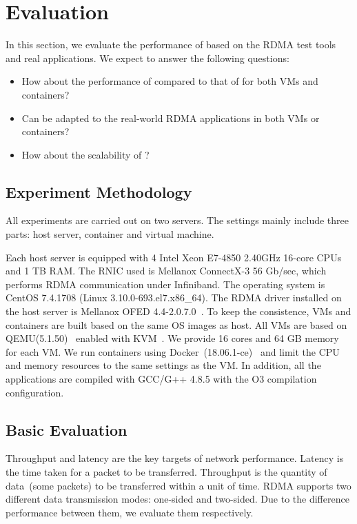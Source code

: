 \section{Evaluation} \label{eval}
In this section, we evaluate the performance of \sys based on the RDMA test tools and real applications. We expect to answer the following questions:

\begin{itemize}
\item How about the performance of \sys compared to that of \native for both VMs and containers?
\item Can \sys be adapted to the real-world RDMA applications in both VMs or containers?
\item How about the scalability of \sys?
\end{itemize}

\subsection{Experiment Methodology}


All experiments are carried out on two servers. The settings mainly include three parts: host server, container and virtual machine. 

Each host server is equipped with 4 Intel Xeon E7-4850 2.40GHz 16-core CPUs and 1 TB RAM. The RNIC used is Mellanox ConnectX-3 56 Gb/sec, which performs RDMA communication under Infiniband.  The operating system is CentOS 7.4.1708 (Linux 3.10.0-693.el7.x86\_64). The RDMA driver installed on the host server is Mellanox OFED 4.4-2.0.7.0~\cite{mlnx-ofed}. To keep the consistence, VMs and containers are built based on the same OS images as host. All VMs are based on QEMU(5.1.50)~\cite{qemu} enabled with KVM~\cite{kvm}. We provide 16 cores and 64 GB memory for each VM. We run containers using Docker~(18.06.1-ce)~\cite{docker} and limit the CPU and memory resources to the same settings as the VM. In addition, all the applications are compiled with GCC/G++ 4.8.5 with the O3 compilation configuration. 


\subsection{Basic Evaluation}

Throughput and latency are the key targets of network performance. Latency is the time taken for a packet to be transferred. Throughput is the quantity of data~(some packets) to be transferred within a unit of time. RDMA supports two different data transmission modes: one-sided and two-sided. Due to the difference performance between them, we evaluate them respectively.


